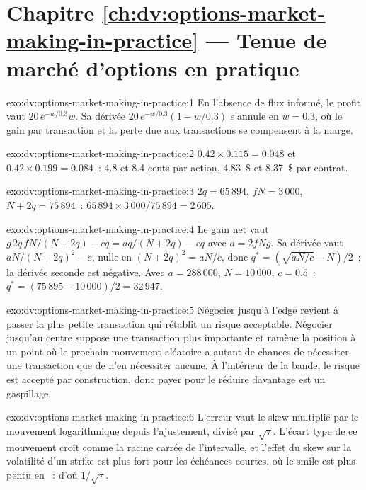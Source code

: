 \section*{Chapitre \ref{ch:dv:options-market-making-in-practice} --- Tenue de marché d'options en pratique}

\begin{solution}{exo:dv:options-market-making-in-practice:1}
En l'absence de flux informé, le profit vaut $20\,e^{-w/0.3}w$. Sa dérivée $20\,e^{-w/0.3}(1-w/0.3)$ s'annule en $w=0.3$, où le gain par transaction
et la perte due aux transactions se compensent à la marge.
\end{solution}

\begin{solution}{exo:dv:options-market-making-in-practice:2}
$0.42\times0.115=0.048$ et $0.42\times0.199=0.084$~: 4.8 et 8.4 cents par action, 4.83~\$ et 8.37~\$ par contrat.
\end{solution}

\begin{solution}{exo:dv:options-market-making-in-practice:3}
$2q=65\,894$, $fN=3\,000$, $N+2q=75\,894$~: $65\,894\times3\,000/75\,894=2\,605$.
\end{solution}

\begin{solution}{exo:dv:options-market-making-in-practice:4}
Le gain net vaut $g\,2q\,fN/(N+2q)-cq=aq/(N+2q)-cq$ avec $a=2fNg$. Sa dérivée vaut $aN/(N+2q)^2-c$, nulle en $(N+2q)^2=aN/c$, donc
$q^*=(\sqrt{aN/c}-N)/2$~; la dérivée seconde est négative. Avec $a=288\,000$, $N=10\,000$, $c=0.5$~: $q^*=(75\,895-10\,000)/2=32\,947$.
\end{solution}

\begin{solution}{exo:dv:options-market-making-in-practice:5}
Négocier jusqu'à l'edge revient à passer la plus petite transaction qui rétablit un risque acceptable. Négocier jusqu'au centre suppose une transaction plus importante et ramène la position à un point où le
prochain mouvement aléatoire a autant de chances de nécessiter une transaction que de n'en nécessiter aucune. À l'intérieur de la bande, le risque est accepté par construction, donc payer pour le réduire davantage est un gaspillage.
\end{solution}

\begin{solution}{exo:dv:options-market-making-in-practice:6}
L'erreur vaut le skew multiplié par le mouvement logarithmique depuis l'ajustement, divisé par $\sqrt\tau$. L'écart type de ce mouvement croît comme la racine carrée de l'intervalle, et
l'effet du skew sur la volatilité d'un strike est plus fort pour les échéances courtes, où le smile est plus pentu en ~: d'où $1/\sqrt\tau$.
\end{solution}

